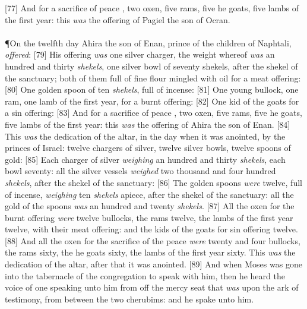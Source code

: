 [77] \textcolor[cmyk]{0.99998,1,0,0}{And for a sacrifice of peace , two oxen, five rams, five he goats, five lambs of the first year: this \emph{was} the offering of Pagiel the son of Ocran.}\\
\\
\P \textcolor[cmyk]{0.99998,1,0,0}{On the twelfth day Ahira the son of Enan, prince of the children of Naphtali, \emph{offered}:}
[79] \textcolor[cmyk]{0.99998,1,0,0}{His offering \emph{was} one silver charger, the weight whereof \emph{was} an hundred and thirty \emph{shekels}, one silver bowl of seventy shekels, after the shekel of the sanctuary; both of them full of fine flour mingled with oil for a meat offering:}
[80] \textcolor[cmyk]{0.99998,1,0,0}{One golden spoon of ten \emph{shekels}, full of incense:}
[81] \textcolor[cmyk]{0.99998,1,0,0}{One young bullock, one ram, one lamb of the first year, for a burnt offering:}
[82] \textcolor[cmyk]{0.99998,1,0,0}{One kid of the goats for a sin offering:}
[83] \textcolor[cmyk]{0.99998,1,0,0}{And for a sacrifice of peace , two oxen, five rams, five he goats, five lambs of the first year: this \emph{was} the offering of Ahira the son of Enan.}
[84] \textcolor[cmyk]{0.99998,1,0,0}{This \emph{was} the dedication of the altar, in the day when it was anointed, by the princes of Israel: twelve chargers of silver, twelve silver bowls, twelve spoons of gold:}
[85] \textcolor[cmyk]{0.99998,1,0,0}{Each charger of silver \emph{weighing} an hundred and thirty \emph{shekels}, each bowl seventy: all the silver vessels \emph{weighed} two thousand and four hundred \emph{shekels}, after the shekel of the sanctuary:}
[86] \textcolor[cmyk]{0.99998,1,0,0}{The golden spoons \emph{were} twelve, full of incense, \emph{weighing} ten \emph{shekels} apiece, after the shekel of the sanctuary: all the gold of the spoons \emph{was} an hundred and twenty \emph{shekels}.}
[87] \textcolor[cmyk]{0.99998,1,0,0}{All the oxen for the burnt offering \emph{were} twelve bullocks, the rams twelve, the lambs of the first year twelve, with their meat offering: and the kids of the goats for sin offering twelve.}
[88] \textcolor[cmyk]{0.99998,1,0,0}{And all the oxen for the sacrifice of the peace  \emph{were} twenty and four bullocks, the rams sixty, the he goats sixty, the lambs of the first year sixty. This \emph{was} the dedication of the altar, after that it was anointed.}
[89] \textcolor[cmyk]{0.99998,1,0,0}{And when Moses was gone into the tabernacle of the congregation to speak with him, then he heard the voice of one speaking unto him from off the mercy seat that \emph{was} upon the ark of testimony, from between the two cherubims: and he spake unto him.}